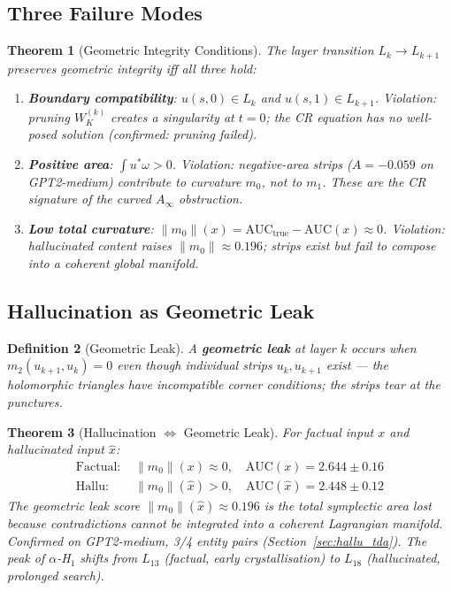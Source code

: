 \documentclass[11pt]{amsart}
\newtheorem{theorem}{Theorem}[section]
\newtheorem{definition}[theorem]{Definition}
\begin{document}
\subsection{Three Failure Modes}

\begin{theorem}[Geometric Integrity Conditions]
\label{thm:integrity}
The layer transition $L_k\to L_{k+1}$ preserves geometric integrity
iff all three hold:
\begin{enumerate}
\item[\textup{(I)}] \textbf{Boundary compatibility}:
  $u(s,0)\in L_k$ and $u(s,1)\in L_{k+1}$.
  \emph{Violation}: pruning $W_K^{(k)}$ creates a singularity at $t=0$;
  the CR equation has no well-posed solution (confirmed: pruning failed).
\item[\textup{(II)}] \textbf{Positive area}: $\int u^*\omega>0$.
  \emph{Violation}: negative-area strips ($A=-0.059$ on GPT2-medium)
  contribute to curvature $m_0$, not to $m_1$.
  These are the CR signature of the curved $A_\infty$ obstruction.
\item[\textup{(III)}] \textbf{Low total curvature}:
  $\|m_0\|(x)=\mathrm{AUC}_{\mathrm{true}}-\mathrm{AUC}(x)\approx 0$.
  \emph{Violation}: hallucinated content raises $\|m_0\|\approx 0.196$;
  strips exist but fail to compose into a coherent global manifold.
\end{enumerate}
\end{theorem}

\subsection{Hallucination as Geometric Leak}

\begin{definition}[Geometric Leak]
A \textbf{geometric leak} at layer $k$ occurs when
$m_2(u_{k+1},u_k)=0$ even though individual strips $u_k,u_{k+1}$ exist
--- the holomorphic triangles have incompatible corner conditions;
the strips tear at the punctures.
\end{definition}

\begin{theorem}[Hallucination $\Leftrightarrow$ Geometric Leak]
\label{thm:hallu_leak}
For factual input $x$ and hallucinated input $\hat{x}$:
\begin{align*}
  \text{Factual: }&\|m_0\|(x)\approx 0,\quad\mathrm{AUC}(x)=2.644\pm 0.16 \\
  \text{Hallu: }&\|m_0\|(\hat{x})>0,\quad\mathrm{AUC}(\hat{x})=2.448\pm 0.12
\end{align*}
The \emph{geometric leak score} $\|m_0\|(\hat{x})\approx 0.196$
is the total symplectic area lost because contradictions cannot be
integrated into a coherent Lagrangian manifold.
Confirmed on GPT2-medium, 3/4 entity pairs
(Section~\ref{sec:hallu_tda}).
The peak of $\alpha$-H$_1$ shifts from $L_{13}$ (factual, early
crystallisation) to $L_{18}$ (hallucinated, prolonged search).
\end{theorem}
\end{document}
